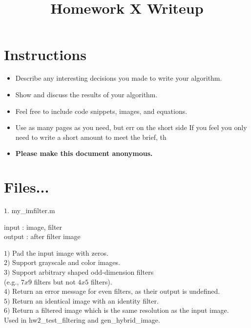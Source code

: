 \date{}

\title{\vspace{-1cm}Homework X Writeup}



\maketitle
\vspace{-3cm}
\thispagestyle{fancy}

\section*{Instructions}
\begin{itemize}
  \item Describe any interesting decisions you made to write your algorithm.
  \item Show and discuss the results of your algorithm.
  \item Feel free to include code snippets, images, and equations.
  \item Use as many pages as you need, but err on the short side If you feel you only need to write a short amount to meet the brief, th
  
  \item \textbf{Please make this document anonymous.}
\end{itemize}
\newcommand\tab[1][1cm]{\hspace*{#1}}
\section*{Files...}  

{\large $1.$ my\_imfilter.m \par}
\tab input : image, filter \\
\tab output : after filter image

\tab $1)$ Pad the input image with zeros. \\
\tab $2)$ Support grayscale and color images. \\
\tab $3)$ Support arbitrary shaped odd-dimension filters \\ \tab (e.g., $7x9$ filters but not $4x5$ filters). \\
\tab $4)$ Return an error message for even filters, as their output is undefined. \\
\tab $5)$ Return an identical image with an identity filter. \\
\tab $6)$ Return a filtered image which is the same resolution as the input image. \\
\tab Used in hw$2$\_test\_filtering and gen\_hybrid\_image.

